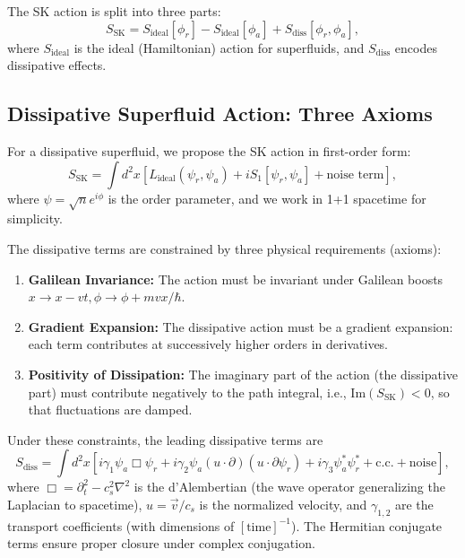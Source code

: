 \documentclass[aps,prl,twocolumn,superscriptaddress,nofootinbib,amsmath,amssymb]{revtex4-2}
\begin{document}
The SK action is split into three parts:
\begin{equation}
\label{eq:sk_action_split}
S_{\text{SK}} = S_{\text{ideal}}[\phi_r] - S_{\text{ideal}}[\phi_a] + S_{\text{diss}}[\phi_r, \phi_a],
\end{equation}
where $S_{\text{ideal}}$ is the ideal (Hamiltonian) action for superfluids, and $S_{\text{diss}}$ encodes dissipative effects.

\subsection{Dissipative Superfluid Action: Three Axioms}

For a dissipative superfluid, we propose the SK action in first-order form:
\begin{equation}
\label{eq:sk_first_order}
S_{\text{SK}} = \int d^2 x \left[ L_{\text{ideal}}(\psi_r, \psi_a) + iS_1[\psi_r, \psi_a] + \text{noise term} \right],
\end{equation}
where $\psi = \sqrt{n}e^{i\phi}$ is the order parameter, and we work in 1+1 spacetime for simplicity.

The dissipative terms are constrained by three physical requirements (axioms):
\begin{enumerate}
\item \textbf{Galilean Invariance:} The action must be invariant under Galilean boosts $x \to x - vt, \phi \to \phi + m v x / \hbar$.
\item \textbf{Gradient Expansion:} The dissipative action must be a gradient expansion: each term contributes at successively higher orders in derivatives.
\item \textbf{Positivity of Dissipation:} The imaginary part of the action (the dissipative part) must contribute negatively to the path integral, i.e., $\text{Im}(S_{\text{SK}}) < 0$, so that fluctuations are damped.
\end{enumerate}

Under these constraints, the leading dissipative terms are
\begin{equation}
\label{eq:dissipative_action}
S_{\text{diss}} = \int d^2 x \left[ i\gamma_1 \psi_a \Box \psi_r + i\gamma_2 \psi_a (u \cdot \partial)(u \cdot \partial \psi_r) + i\gamma_3 \psi_a^* \psi_r^* + \text{c.c.} + \text{noise} \right],
\end{equation}
where $\Box = \partial_t^2 - c_s^2 \nabla^2$ is the d'Alembertian (the wave operator generalizing the Laplacian to spacetime), $u = \vec{v}/c_s$ is the normalized velocity, and $\gamma_{1,2}$ are the transport coefficients (with dimensions of $[\text{time}]^{-1}$). The Hermitian conjugate terms ensure proper closure under complex conjugation.
\end{document}

